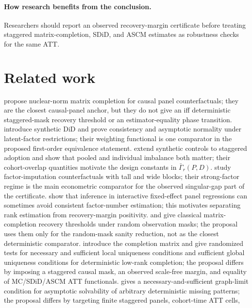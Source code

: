 \documentclass[11pt]{article}
\theoremstyle{definition}
\theoremstyle{plain}
\theoremstyle{remark}
\begin{document}
\paragraph{How research benefits from the conclusion.}
Researchers should report an observed recovery-margin certificate before
treating staggered matrix-completion, SDiD, and ASCM estimates as robustness
checks for the same ATT.

\section{Related work}
\citet{AtheyBayatiDoudchenkoImbensKhosravi2021} propose nuclear-norm matrix
completion for causal panel counterfactuals; they are the closest causal-panel
anchor, but they do not give an iff deterministic staggered-mask recovery
threshold or an estimator-equality phase transition.
\citet{ArkhangelskyAtheyHirshbergImbensWager2021} introduce synthetic DiD and
prove consistency and asymptotic normality under latent-factor restrictions;
their weighting functional is one comparator in the proposed first-order
equivalence statement.
\citet{BenMichaelFellerRothstein2022} extend synthetic controls to staggered
adoption and show that pooled and individual imbalance both matter; their
cohort-overlap quantities motivate the design constants in $\bar\Gamma_r(P,D)$.
\citet{BaiNg2021} study factor-imputation counterfactuals with tall and wide
blocks; their strong-factor regime is the main econometric comparator for the
observed singular-gap part of the certificate.
\citet{MoonWeidner2015} show that inference in interactive fixed-effect panel
regressions can sometimes avoid consistent factor-number estimation; this
motivates separating rank estimation from recovery-margin positivity.
\citet{CandesTao2010} and \citet{KeshavanMontanariOh2010} give classical
matrix-completion recovery thresholds under random observation masks; the
proposal uses them only for the random-mask sanity reduction, not as the
closest deterministic comparator.
\citet{SingerCucuringu2010} introduce the completion matrix and give
randomized tests for necessary and sufficient local uniqueness conditions and
sufficient global uniqueness conditions for deterministic low-rank completion;
the proposal differs by imposing a staggered causal mask, an observed
scale-free margin, and equality of MC/SDiD/ASCM ATT functionals.
\citet{Chatterjee2020} gives a necessary-and-sufficient graph-limit condition
for asymptotic solvability of arbitrary deterministic missing patterns; the
proposal differs by targeting finite staggered panels, cohort-time ATT cells,
\end{document}
